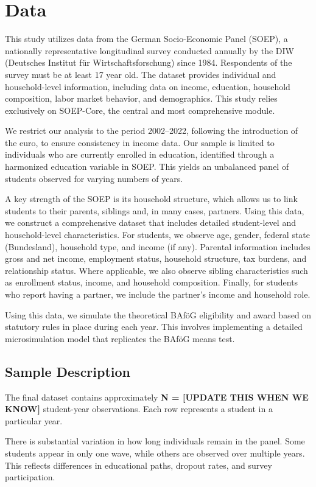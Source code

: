 \section{Data}
This study utilizes data from the German Socio-Economic Panel (SOEP), a nationally representative longitudinal survey conducted annually by the DIW (Deutsches Institut für Wirtschaftsforschung) since 1984. Respondents of the survey must be at least 17 year old. The dataset provides individual and household-level information, including data on income, education, household composition, labor market behavior, and demographics. This study relies exclusively on SOEP-Core, the central and most comprehensive module.

We restrict our analysis to the period 2002–2022, following the introduction of the euro, to ensure consistency in income data. Our sample is limited to individuals who are currently enrolled in education, identified through a harmonized education variable in SOEP. This yields an unbalanced panel of students observed for varying numbers of years.

A key strength of the SOEP is its household structure, which allows us to link students to their parents, siblings and, in many cases, partners.
Using this data, we construct a comprehensive dataset that includes detailed student-level and household-level characteristics. For students, we observe age, gender, federal state (Bundesland), household type, and income (if any). Parental information includes gross and net income, employment status, household structure, tax burdens, and relationship status. Where applicable, we also observe sibling characteristics such as enrollment status, income, and household composition. Finally, for students who report having a partner, we include the partner’s income and household role.

Using this data, we simulate the theoretical BAföG eligibility and award based on statutory rules in place during each year. This involves implementing a detailed microsimulation model that replicates the BAföG means test.

\subsection{Sample Description}
The final dataset contains approximately \textbf{N = [UPDATE THIS WHEN WE KNOW]} student-year observations. Each row represents a student in a particular year.

There is substantial variation in how long individuals remain in the panel. Some students appear in only one wave, while others are observed over multiple years. This reflects differences in educational paths, dropout rates, and survey participation.

